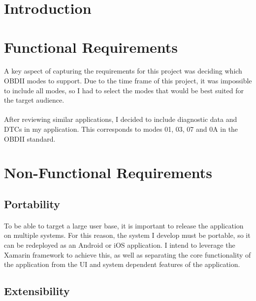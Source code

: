 \section{Introduction}
	\paragraph{}{
	
	}		
	
\section{Functional Requirements}	
	\paragraph{}{
	A key aspect of capturing the requirements for this project was deciding which OBDII modes to support. Due to the time frame of this project, it was impossible to include all modes, so I had to select the modes that would be best suited for the target audience.
	}
	\paragraph{}{
	After reviewing similar applications, I decided to include diagnostic data and DTCs in my application. This corresponds to modes 01, 03, 07 and 0A in the OBDII standard.
	}

\section{Non-Functional Requirements}
	\subsection{Portability}
		\paragraph{}{
		To be able to target a large user base, it is important to release the application on multiple systems. For this reason, the system I develop must be portable, so it can be redeployed as an Android or iOS application. I intend to leverage the Xamarin framework to achieve this, as well as separating the core functionality of the application from the UI and system dependent features of the application.
		}
	\subsection{Extensibility}
